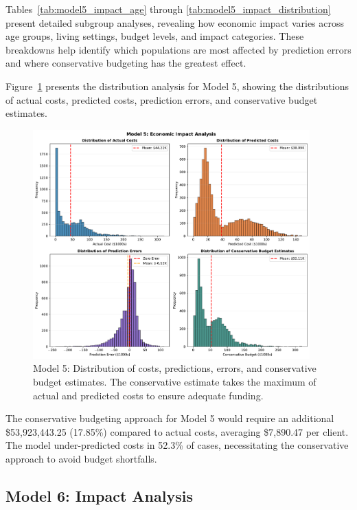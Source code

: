 Tables~\ref{tab:model5_impact_age} through \ref{tab:model5_impact_distribution} present detailed subgroup analyses, revealing how economic impact varies across age groups, living settings, budget levels, and impact categories. These breakdowns help identify which populations are most affected by prediction errors and where conservative budgeting has the greatest effect.

Figure~\ref{fig:model5_impact_histograms} presents the distribution analysis for Model 5, showing the distributions of actual costs, predicted costs, prediction errors, and conservative budget estimates.

\begin{figure}[htbp]
\centering
\includegraphics[width=0.95\textwidth]{figures/model_5_Impact_Histograms.pdf}
\caption{Model 5: Distribution of costs, predictions, errors, and conservative budget estimates. The conservative estimate takes the maximum of actual and predicted costs to ensure adequate funding.}
\label{fig:model5_impact_histograms}
\end{figure}

The conservative budgeting approach for Model 5 would require an additional \$53,923,443.25 (17.85\%) compared to actual costs, averaging \$7,890.47 per client. The model under-predicted costs in 52.3\% of cases, necessitating the conservative approach to avoid budget shortfalls. 

\clearpage

\subsection{Model 6: Impact Analysis}
\label{subsec:model6_impact}

